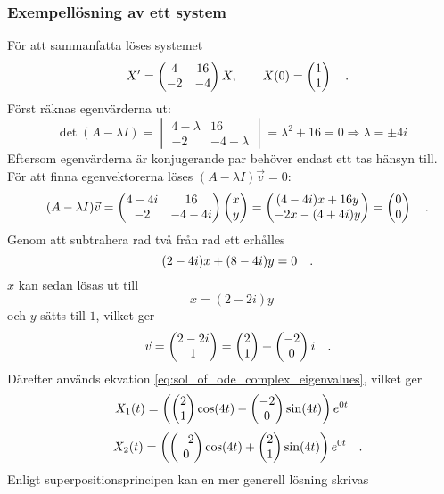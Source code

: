 \subsubsection{Exempellösning av ett system}
För att sammanfatta löses systemet
\begin{equation}
    X'=\begin{pmatrix}4&16\\-2&-4\end{pmatrix}X,\qquad X(0)=\begin{pmatrix}1\\1\end{pmatrix}
\quad\mathrm{.}\!\!\!\!\!\!\end{equation} Först räknas egenvärderna ut:
\begin{equation}
    \det(A-\lambda I)=\begin{vmatrix}
        4-\lambda&16\\-2&-4-\lambda
    \end{vmatrix}=\lambda^2+16=0\Rightarrow\lambda=\pm 4i
\end{equation}
Eftersom egenvärderna är konjugerande par behöver endast ett tas hänsyn till. För att finna egenvektorerna löses \((A-\lambda I)\vec{v}=0\):
\begin{equation}
    (A-\lambda I)\vec{v}=\begin{pmatrix}4-4i&16\\-2&-4-4i\end{pmatrix}\begin{pmatrix}x\\y\end{pmatrix}=\begin{pmatrix}(4-4i)x+16y\\-2x-(4+4i)y\end{pmatrix}=\begin{pmatrix}0\\0\end{pmatrix}
\quad\mathrm{.}\!\!\!\!\!\!\end{equation} Genom att subtrahera rad två från rad ett erhålles
\begin{equation}
    (2-4i)x+(8-4i)y=0
\quad\mathrm{.}\!\!\!\!\!\!\end{equation} \(x\) kan sedan lösas ut till
\begin{equation}
    x=(2-2i)y
\end{equation} och \(y\) sätts till \(1\), vilket ger
\begin{equation}
    \vec{v}=\begin{pmatrix}2-2i\\1\end{pmatrix}=\begin{pmatrix}2\\1\end{pmatrix}+\begin{pmatrix}-2\\0\end{pmatrix}i
\quad\mathrm{.}\!\!\!\!\!\!\end{equation} Därefter används ekvation \ref{eq:sol_of_ode_complex_eigenvalues}, vilket ger
\begin{equation}
    X_1(t)=\left(\begin{pmatrix}2\\1\end{pmatrix}\cos(4t)-\begin{pmatrix}-2\\0\end{pmatrix}\sin(4t)\right)e^{0t}
\end{equation}
\begin{equation}
    X_2(t)=\left(\begin{pmatrix}-2\\0\end{pmatrix}\cos(4t)+\begin{pmatrix}2\\1\end{pmatrix}\sin(4t)\right)e^{0t}
\quad\mathrm{.}\!\!\!\!\!\!\end{equation} Enligt superpositionsprincipen kan en mer generell lösning skrivas
